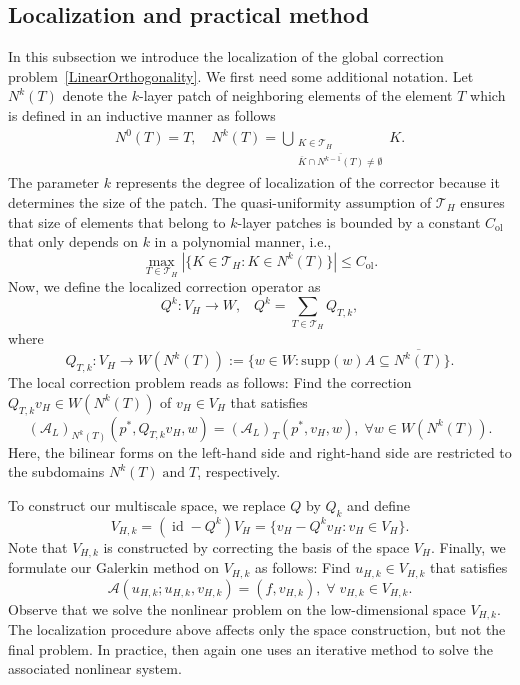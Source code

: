 \documentclass{article}
\begin{document}
 \subsection{Localization and practical method}
In this subsection we introduce the localization of the global correction problem~\eqref{LinearOrthogonality}. We first need some additional notation. 
 Let $N^k(T)$ denote the $k$-layer patch of neighboring elements of the element $T$ which is defined in an inductive manner as follows
\begin{align*}
N^0(T)=T, \quad 
N^k(T)=\bigcup_{\substack{K \in 
\mathcal{T}_H \\ \overline{K} \cap \overline{N^{k-1}(T)} \neq \emptyset} }K.
\end{align*}
The parameter $k$ represents the degree of localization of the corrector because it determines the size of the patch. The quasi-uniformity assumption of $\mathcal{T}_H$ ensures that size of elements that belong to $k$-layer patches is bounded by a constant $C_\mathrm{ol}$ that only depends on $k$ in a polynomial manner, i.e., 
\begin{equation}\label{Uniform_regu}
\max_{T \in \mathcal{T}_H}|\{K \in \mathcal{T}_H:K \in N^k(T)\}| \leq C_\mathrm{ol}.
\end{equation}
Now, we define the localized correction operator as \[Q^k:V_H \xrightarrow{} W , \;\;\; Q^k=\sum_{T \in \mathcal{T}_H } Q_{T,k},\] where 
\[ Q_{T,k}:V_H \xrightarrow{}W(N^{k}(T)):=\{ w \in W : \text{supp}(w) A \subseteq\overline{N^k(T)}\}.\]
The local correction problem reads as follows: Find the correction $Q_{T,k}v_H \in W(N^k(T))$ of $v_H \in V_H$ that satisfies
\begin{equation}\label{Corr}
    (\mathcal{A}_L)_{N^k(T)}(p^*,Q_{T,k}v_H, w)=(\mathcal{A}_L)_{T}(p^*,v_H, w) , \;\forall w \in W(N^{k}(T)).
\end{equation}
Here, the bilinear forms on the left-hand side and right-hand side are restricted to the subdomains ${N^k(T)} \; \text{and} \; T$, respectively. 

To construct our multiscale space, we replace $Q$ by $Q_k$ and define \[V_{H,k}=(\operatorname{id}-Q^k)V_H=\{v_H-Q^kv_H: v_H \in V_H\}.\] Note that $V_{H,k}$ is constructed by correcting the basis of the space $V_H$. Finally, we formulate our Galerkin method on $V_{H,k}$ as follows: Find $u_{H,k} \in V_{H,k}$ that satisfies
\begin{equation}\label{local_probelm }
    \mathcal{A}(u_{H,k};u_{H,k},v_{H,k})=(f,v_{H,k}), \; \forall \;v_{H,k} \in V_{H,k}.
\end{equation}
Observe that we solve the nonlinear problem on the low-dimensional space $V_{H,k}$. The localization procedure above affects only the space construction, but not the final problem. In practice, then again one uses an iterative method to solve the associated nonlinear system.
 
\end{document}
